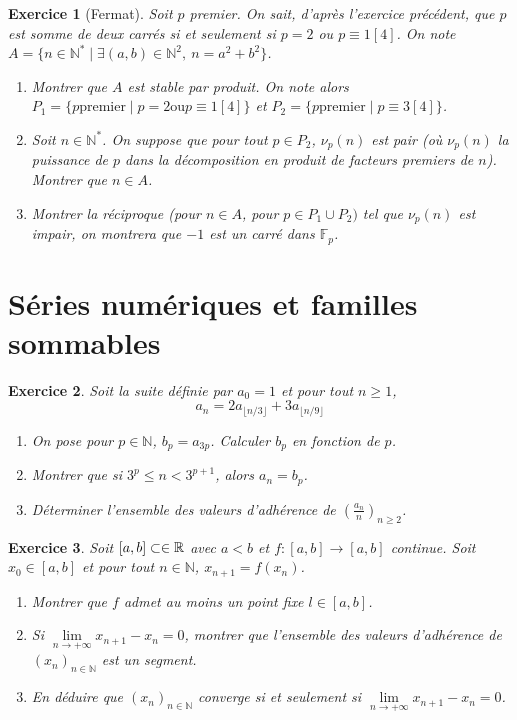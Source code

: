 \documentclass[12pt]{article}
\newtheorem{exercise}{Exercice}[section]
\theoremstyle{remark}
\theoremstyle{remark}
\newcommand{\N}{\mathbb{N}} \newcommand{\Z}{\mathbb{Z}}
\begin{document}
\begin{exercise}[Fermat]
	Soit $p$ premier. On sait, d'après l'exercice précédent, que $p$ est somme de
	deux carrés si et seulement si $p=2$ ou $p\equiv 1[4]$. On note
	$A=\{n\in\N^{*}\mid\exists(a,b)\in\N^{2},~n=a^{2}+b^{2}\}$.
	\begin{enumerate}
		\item
		Montrer que $A$ est stable par produit. On note alors $P_{1}=\{p
		\text{premier}\mid p=2\text{ou}p\equiv 1[4]\}$ et
		$P_{2}=\{p\text{premier}\mid p\equiv3[4]\}$.
		\item
		Soit $n\in\N^{*}$. On suppose que pour tout $p\in P_{2}$, $\nu_{p}(n)$ est
		pair (où $\nu_{p}(n)$ la puissance de $p$ dans la décomposition en produit
		de facteurs premiers de $n$). Montrer que $n\in A$.
		\item
		Montrer la réciproque (pour $n\in A$, pour $p\in P_{1}\cup P_{2})$ tel que
		$\nu_{p}(n)$ est impair, on montrera que $-1$ est un carré dans
		$\mathbb{F}_{p}$.
	\end{enumerate}
\end{exercise}

\cleardoublepage
\section{Séries numériques et familles sommables}

\begin{exercise}
	Soit la suite définie par $a_{0}=1$ et pour tout $n\geqslant1$,
	$$a_{n}=2a_{\lfloor n/3\rfloor}+3a_{\lfloor n/9\rfloor}$$
	\begin{enumerate}
		\item
		On pose pour $p\in\N$, $b_{p}=a_{3p}$. Calculer $b_{p}$ en fonction de
		$p$.
		\item
		Montrer que si $3^{p}\leqslant n<3^{p+1}$, alors $a_{n}=b_{p}$.
		\item
		Déterminer l'ensemble des valeurs d'adhérence de
		$(\frac{a_{n}}{n})_{n\geqslant 2}$.
	\end{enumerate}
\end{exercise}

\begin{exercise}
	Soit $[a,b]\subset\in\mathbb{R}$ avec $a<b$ et $f:[a,b]\to[a,b]$ continue. Soit
	$x_{0}\in[a,b]$ et pour tout $n\in\N$, $x_{n+1}=f(x_{n})$.
	\begin{enumerate}
		\item
		Montrer que $f$ admet au moins un point fixe $l\in[a,b]$.
		\item
		Si $\lim\limits_{n\to+\infty}x_{n+1}-x_{n}=0$, montrer que l'ensemble des
		valeurs d'adhérence de $(x_{n})_{n\in\N}$ est un segment.
		\item
		En déduire que $(x_{n})_{n\in\N}$ converge si et seulement si
		$\lim\limits_{n\to+\infty}x_{n+1}-x_{n}=0$.
	\end{enumerate}
\end{exercise}
\end{document}

